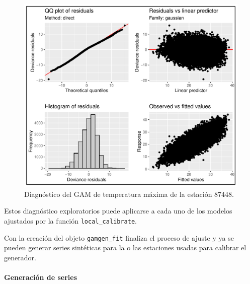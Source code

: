 \documentclass[
  12pt]{article}
\newenvironment{Shaded}{}{}
\newcommand{\CommentTok}[1]{\textcolor[rgb]{0.38,0.63,0.69}{\textit{#1}}}
\newcommand{\DataTypeTok}[1]{\textcolor[rgb]{0.56,0.13,0.00}{#1}}
\newcommand{\KeywordTok}[1]{\textcolor[rgb]{0.00,0.44,0.13}{\textbf{#1}}}
\newcommand{\NormalTok}[1]{#1}
\newcommand{\OperatorTok}[1]{\textcolor[rgb]{0.40,0.40,0.40}{#1}}
\newcommand{\StringTok}[1]{\textcolor[rgb]{0.25,0.44,0.63}{#1}}
\begin{document}
\begin{Shaded}
\end{Shaded}

\begin{figure}[H]

{\centering \includegraphics{Manual_Generador_files/figure-latex/diagnostico-modelo-local-ind-1} 

}

\caption{Diagnóstico del GAM de temperatura máxima de la estación 87448.}\label{fig:diagnostico-modelo-local-ind}
\end{figure}

Estos diagnóstico exploratorios puede aplicarse a cada uno de los modelos ajustados por la función \texttt{local\_calibrate}.

Con la creación del objeto \texttt{gamgen\_fit} finaliza el proceso de ajuste y ya se pueden generar series sintéticas para la o las estaciones usadas para calibrar el generador.

\hypertarget{generaciuxf3n-de-series}{%
\paragraph{Generación de series}\label{generaciuxf3n-de-series}}
\end{document}
